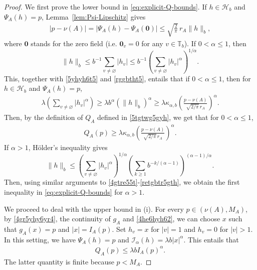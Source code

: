 \documentclass[a4paper, 11pt]{article}
\newcommand{\1}{\mathbf 1}
\theoremstyle{plain}
\begin{document}
\begin{proof}We first prove the lower bound in \eqref{eq:explicit-Q-bounds}.
If $h\in\mathcal{H}_b$ and \(\Psi_A(h)=p\), Lemma~\ref{lem:Psi-Lipschitz} gives
\begin{align}\label{5yhyh6t5}
  |p-\nu(A)|=|\Psi_A(h)-\Psi_A(\mathbf{0})|
  \leq
  \sqrt{\frac{2}{\pi}}\,r_A\|h\|_b,
\end{align}
where $\mathbf{0}$ stands for the zero field (i.e. $\mathbf{0}_v=0$ for any $v\in\mathbb{T}_b$).
If \(0<\alpha\leq1\), then
\[
  \|h\|_b
  \leq
  b^{-1}\sum_{v\neq\varnothing}|h_v|
  \leq
  b^{-1}
  \left(\sum_{v\neq\varnothing}|h_v|^\alpha\right)^{1/\alpha}.
\]
This, together with \eqref{5yhyh6t5} and \eqref{rggbtht5}, entails that if \(0<\alpha\leq1\), then for $h\in\mathcal{H}_b$ and \(\Psi_A(h)=p\),
\begin{align}\label{4gtre55t}
\lambda\left(\sum_{v\neq\varnothing}|h_v|^\alpha\right)\geq \lambda b^{\alpha}(\|h\|_b)^{\alpha}\geq \lambda\kappa_{\alpha,b}
  \left(
    \frac{p-\nu(A)}
    {\sqrt{2/\pi}\,r_A}
  \right)^\alpha.
\end{align}
Then, by the definition of $Q_A$ defined in \eqref{5tgtwg5gyh}, we get that for \(0<\alpha\leq1\),
\begin{align}\label{retgbtr5gth}
Q_A(p)\geq\lambda\kappa_{\alpha,b}
  \left(
    \frac{p-\nu(A)}
    {\sqrt{2/\pi}\,r_A}
  \right)^\alpha.
\end{align}
If \(\alpha>1\), H\"older's inequality gives
\[
  \|h\|_b
  \leq
  \left(\sum_{v\neq\varnothing}|h_v|^\alpha\right)^{1/\alpha}
  \left(\sum_{k\geq1}b^{-k/(\alpha-1)}\right)^{(\alpha-1)/\alpha}.
\]
Then, using similar arguments to \eqref{4gtre55t}-\eqref{retgbtr5gth}, we obtain the first inequality in
\eqref{eq:explicit-Q-bounds} for \(\alpha>1\).
\par
We proceed to deal with the upper bound in (i). For every \(p\in(\nu(A),M_A)\), by \eqref{4gr5yhy6yr4}, the continuity of $g_A$ and \eqref{4he6hyh62}, we can choose \(x\) such that \(g_A(x)=p\) and $|x|=I_A(p)$. Set $h_v=x$ for $|v|=1$ and $h_v=0$ for $|v|>1$. In this setting, we have $\Psi_A(h)=p$ and $\mathcal{I_{\alpha}}(h)=\lambda b|x|^\alpha$.  This entails that
\begin{align}\label{tryj66tyj}
  Q_A(p)\leq\lambda b I_A(p)^\alpha.
\end{align}
The latter quantity is finite because \(p<M_A\).
\par


\end{proof}
\end{document}
